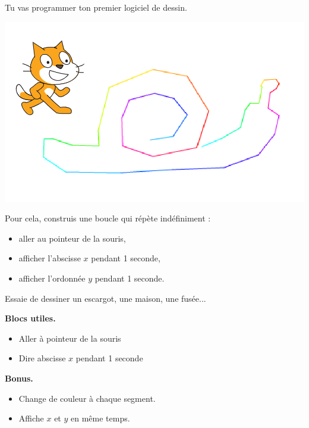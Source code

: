 \documentclass[class=report,crop=false, 12pt]{standalone}
\begin{document}
\begin{activite}
Tu vas programmer ton premier logiciel de dessin.

\begin{center}
  \includegraphics[scale=\scaleecran,scale=0.9]{ecran-03-ex2}   
\end{center}

Pour cela, construis une boucle qui répète indéfiniment :
\begin{itemize}
  \item aller au pointeur de la souris,
  \item afficher l'abscisse $x$ pendant 1 seconde,
  \item afficher l'ordonnée $y$ pendant 1 seconde.
\end{itemize}

Essaie de dessiner un escargot, une maison, une fusée...

\bigskip

\textbf{Blocs utiles.}
\begin{itemize}
  \item Aller à \og pointeur de la souris \fg{}
  \item Dire \og abscisse $x$ \fg{} pendant 1 seconde
\end{itemize}

\bigskip

\textbf{Bonus.}
\begin{itemize}
  \item Change de couleur à chaque segment.
  \item Affiche $x$ et $y$ en même temps.
\end{itemize}
\end{activite}
\end{document}
